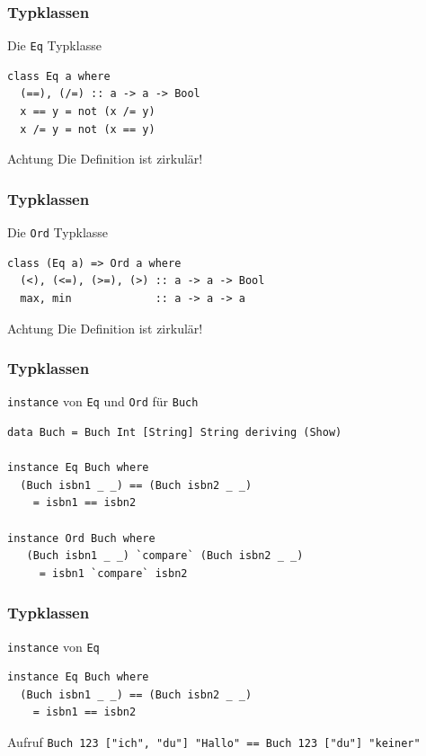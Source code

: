 \documentclass[fleqn,11pt,aspectratio=43]{beamer}
\begin{document}
\begin{frame}[fragile]
\frametitle{Typklassen}
\begin{block}{Die \lstinline|Eq| Typklasse}
\begin{lstlisting}
class Eq a where
  (==), (/=) :: a -> a -> Bool
  x == y = not (x /= y)
  x /= y = not (x == y)
\end{lstlisting}
\end{block}
\begin{alertblock}{Achtung}
Die Definition ist zirkulär!
\end{alertblock}
\end{frame}

\begin{frame}[fragile]
\frametitle{Typklassen}
\begin{block}{Die \lstinline|Ord| Typklasse}
\begin{lstlisting}
class (Eq a) => Ord a where
  (<), (<=), (>=), (>) :: a -> a -> Bool
  max, min             :: a -> a -> a
\end{lstlisting}
\end{block}
\begin{alertblock}{Achtung}
Die Definition ist zirkulär!
\end{alertblock}
\end{frame}

\begin{frame}[fragile]
\frametitle{Typklassen}
\begin{block}{\lstinline|instance| von \lstinline|Eq| und \lstinline|Ord| für \lstinline|Buch|}
\begin{lstlisting}
data Buch = Buch Int [String] String deriving (Show)

instance Eq Buch where 
  (Buch isbn1 _ _) == (Buch isbn2 _ _) 
    = isbn1 == isbn2
  
instance Ord Buch where
   (Buch isbn1 _ _) `compare` (Buch isbn2 _ _) 
     = isbn1 `compare` isbn2
\end{lstlisting}
\end{block}
\end{frame}

\begin{frame}[fragile]
\frametitle{Typklassen}
\begin{block}{\lstinline|instance| von \lstinline|Eq|}
\begin{lstlisting}
instance Eq Buch where 
  (Buch isbn1 _ _) == (Buch isbn2 _ _) 
    = isbn1 == isbn2
\end{lstlisting}
\end{block}
\begin{block}{Aufruf}
\lstinline|Buch 123 ["ich", "du"] "Hallo" == Buch 123 ["du"] "keiner"|
\end{block}
\end{frame}
\end{document}
